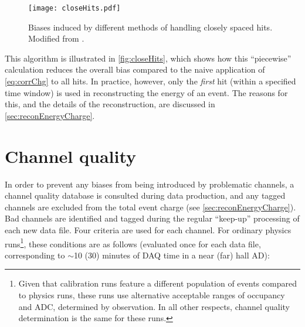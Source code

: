 \documentclass[../thesis.tex]{subfiles}
\begin{document}
\begin{figure}[ht]
  \texttt{[image: closeHits.pdf]}
  \caption{Biases induced by different methods of handling closely spaced hits. Modified from \cite{closeHits}.}
  \label{fig:closeHits}
\end{figure}

This algorithm is illustrated in \autoref{fig:closeHits}, which shows how this ``piecewise'' calculation reduces the overall bias compared to the naive application of \autoref{eq:corrChg} to all hits. In practice, however, only the \emph{first} hit (within a specified time window) is used in reconstructing the energy of an event. The reasons for this, and the details of the reconstruction, are discussed in \autoref{sec:reconEnergyCharge}.



\section{Channel quality}
\label{sec:calibCQ}

In order to prevent any biases from being introduced by problematic channels, a channel quality database is consulted during data production, and any tagged channels are excluded from the total event charge (see \autoref{sec:reconEnergyCharge}). Bad channels are identified and tagged during the regular ``keep-up'' processing of each new data file. Four criteria are used for each channel. For ordinary physics runs\footnote{Given that calibration runs feature a different population of events compared to physics runs, these runs use alternative acceptable ranges of occupancy and ADC, determined by observation. In all other respects, channel quality determination is the same for these runs.}, these conditions are as follows (evaluated once for each data file, corresponding to $\sim$10 (30) minutes of DAQ time in a near (far) hall AD):
\end{document}
